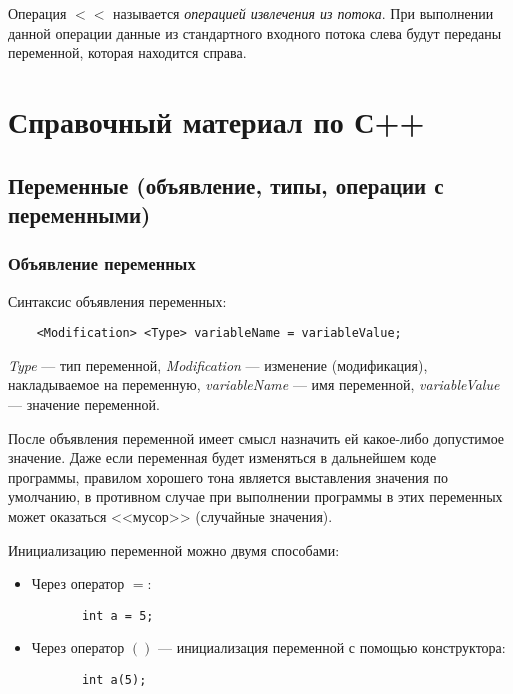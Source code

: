 Операция $<<$ называется \textit{операцией извлечения из потока}. При выполнении данной операции данные из стандартного входного потока слева будут переданы переменной, которая находится справа.

\section{Справочный материал по С++}

\subsection{Переменные (объявление, типы, операции с переменными)}

\subsubsection{Объявление переменных}
Синтаксис объявления переменных:

\begin{lstlisting}
    <Modification> <Type> variableName = variableValue;
\end{lstlisting}

\textit{Type} --- тип переменной, \textit{Modification} --- изменение (модификация), накладываемое на переменную, \textit{variableName} --- имя переменной, \textit{variableValue} --- значение переменной.

После объявления переменной имеет смысл назначить ей какое-либо допустимое значение. Даже если переменная будет изменяться в дальнейшем коде программы, правилом хорошего тона является выставления значения по умолчанию, в противном случае при выполнении программы в этих переменных может оказаться <<мусор>> (случайные значения).

Инициализацию переменной можно двумя способами:
\begin{itemize}
    \item Через оператор $=$:
    \begin{lstlisting}
       int a = 5;
    \end{lstlisting}
    \item Через оператор $()$ --- инициализация переменной с помощью конструктора:
    \lstset{style=CPlusPlus}
    \begin{lstlisting}
       int a(5);
    \end{lstlisting}
\end{itemize}

